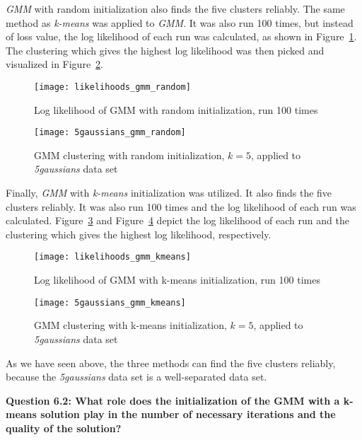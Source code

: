 \textit{GMM} with random initialization also finds the five clusters reliably. The same method as \textit{k-means} was applied to \textit{GMM}. It was also run 100 times, but instead of loss value, the log likelihood of each run was calculated, as shown in Figure~\ref{fig:likelihoods_gmm_random}. The clustering which gives the highest log likelihood was then picked and visualized in Figure~\ref{fig:5gaussians_gmm_random}.

\begin{figure}[h!]
	\centering
	\texttt{[image: likelihoods\_gmm\_random]}
	\caption{Log likelihood of GMM with random initialization, run 100 times}
	\label{fig:likelihoods_gmm_random}
\end{figure}

\begin{figure}[h!]
	\centering
	\texttt{[image: 5gaussians\_gmm\_random]}
	\caption{GMM clustering with random initialization, $k=5$, applied to \textit{5gaussians} data set}
	\label{fig:5gaussians_gmm_random}
\end{figure}

Finally, \textit{GMM} with \textit{k-means} initialization was utilized. It also finds the five clusters reliably. It was also run 100 times and the log likelihood of each run was calculated. Figure~\ref{fig:likelihoods_gmm_kmeans} and Figure~\ref{fig:5gaussians_gmm_kmeans} depict the log likelihood of each run and the clustering which gives the highest log likelihood, respectively.

\begin{figure}[h!]
	\centering
	\texttt{[image: likelihoods\_gmm\_kmeans]}
	\caption{Log likelihood of GMM with k-means initialization, run 100 times}
	\label{fig:likelihoods_gmm_kmeans}
\end{figure}

\begin{figure}[h!]
	\centering
	\texttt{[image: 5gaussians\_gmm\_kmeans]}
	\caption{GMM clustering with k-means initialization, $k=5$, applied to \textit{5gaussians} data set}
	\label{fig:5gaussians_gmm_kmeans}
\end{figure}

As we have seen above, the three methods can find the five clusters reliably, because the \textit{5gaussians} data set is a well-separated data set.

{\raggedright \textbf{Question 6.2: What role does the initialization of the GMM with a k-means solution play in the number of necessary iterations and the quality of the solution?}}\\

